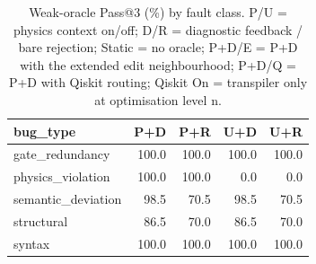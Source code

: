 \begin{table}[t]
\centering
\caption{Weak-oracle Pass@3 (\%) by fault class. P/U = physics context on/off; D/R = diagnostic feedback / bare rejection; Static = no oracle; P+D/E = P+D with the extended edit neighbourhood; P+D/Q = P+D with Qiskit routing; Qiskit On = transpiler only at optimisation level n.}
\label{tab:weakclass}
\footnotesize
\setlength{\tabcolsep}{3pt}
\begin{tabular}{lrrrr}
\toprule
bug\_type & P+D & P+R & U+D & U+R \\
\midrule
gate\_redundancy & 100.0 & 100.0 & 100.0 & 100.0 \\
physics\_violation & 100.0 & 100.0 & 0.0 & 0.0 \\
semantic\_deviation & 98.5 & 70.5 & 98.5 & 70.5 \\
structural & 86.5 & 70.0 & 86.5 & 70.0 \\
syntax & 100.0 & 100.0 & 100.0 & 100.0 \\
\bottomrule
\end{tabular}
\end{table}
